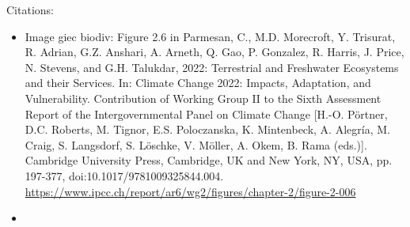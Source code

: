 \documentclass{beamer}
\begin{document}
\begin{frame}{Citations:}
\protect\hypertarget{citations}{}
\begin{itemize}
\item
  Image giec biodiv: Figure 2.6 in Parmesan, C., M.D. Morecroft, Y.
  Trisurat, R. Adrian, G.Z. Anshari, A. Arneth, Q. Gao, P. Gonzalez, R.
  Harris, J. Price, N. Stevens, and G.H. Talukdar, 2022: Terrestrial and
  Freshwater Ecosystems and their Services. In: Climate Change 2022:
  Impacts, Adaptation, and Vulnerability. Contribution of Working Group
  II to the Sixth Assessment Report of the Intergovernmental Panel on
  Climate Change {[}H.-O. Pörtner, D.C. Roberts, M. Tignor, E.S.
  Poloczanska, K. Mintenbeck, A. Alegría, M. Craig, S. Langsdorf, S.
  Löschke, V. Möller, A. Okem, B. Rama (eds.){]}. Cambridge University
  Press, Cambridge, UK and New York, NY, USA, pp. 197-377,
  doi:10.1017/9781009325844.004.
  \href{https://www.ipcc.ch/report/ar6/wg2/figures/chapter-2/figure-2-006}{https://www.ipcc.ch/report/ar6/wg2/figures/chapter-2/figure-2-006}
\item
\end{itemize}
\end{frame}
\end{document}
